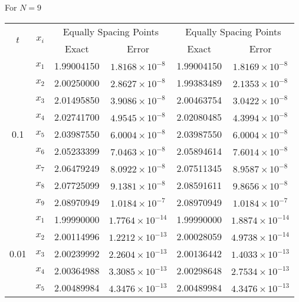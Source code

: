 	For \( N = 9 \)
	
	\begin{table}[ht]
		\renewcommand{\arraystretch}{1.5}
		\centering
		\begin{english}
\begin{tabular}{|c|c|c|c|c|c|}
			\hline
			\multirow{2}{*}{\( t \)} & \multirow{2}{*}{\( x_i \)} & \multicolumn{2}{c|}{Equally Spacing Points} & \multicolumn{2}{c|}{Equally Spacing Points} \\
			\cline{3-6}
			& & Exact & Error & Exact & Error \\
			\hline
			\multirow{9}{*}{0.1} & \( x_1 \) & 1.99004150 & \( 1.8168 \times 10^{-8} \) & 1.99004150 & \( 1.8169 \times 10^{-8} \) \\
			& \( x_2 \) & 2.00250000 & \( 2.8627 \times 10^{-8} \) & 1.99383489 & \( 2.1353 \times 10^{-8} \) \\
			& \( x_3 \) & 2.01495850 & \( 3.9086 \times 10^{-8} \) & 2.00463754 & \( 3.0422 \times 10^{-8} \) \\
			& \( x_4 \) & 2.02741700 & \( 4.9545 \times 10^{-8} \) & 2.02080485 & \( 4.3994 \times 10^{-8} \) \\
			& \( x_5 \) & 2.03987550 & \( 6.0004 \times 10^{-8} \) & 2.03987550 & \( 6.0004 \times 10^{-8} \) \\
			& \( x_6 \) & 2.05233399 & \( 7.0463 \times 10^{-8} \) & 2.05894614 & \( 7.6014 \times 10^{-8} \) \\
			& \( x_7 \) & 2.06479249 & \( 8.0922 \times 10^{-8} \) & 2.07511345 & \( 8.9587 \times 10^{-8} \) \\
			& \( x_8 \) & 2.07725099 & \( 9.1381 \times 10^{-8} \) & 2.08591611 & \( 9.8656 \times 10^{-8} \) \\
			& \( x_9 \) & 2.08970949 & \( 1.0184 \times 10^{-7} \) & 2.08970949 & \( 1.0184 \times 10^{-7} \) \\
			\hline
			\multirow{9}{*}{0.01} & \( x_1 \) & 1.99990000 & \( 1.7764 \times 10^{-14} \) & 1.99990000 & \( 1.8874 \times 10^{-14} \) \\
			& \( x_2 \) & 2.00114996 & \( 1.2212 \times 10^{-13} \) & 2.00028059 & \( 4.9738 \times 10^{-14} \) \\
			& \( x_3 \) & 2.00239992 & \( 2.2604 \times 10^{-13} \) & 2.00136442 & \( 1.4033 \times 10^{-13} \) \\
			& \( x_4 \) & 2.00364988 & \( 3.3085 \times 10^{-13} \) & 2.00298648 & \( 2.7534 \times 10^{-13} \) \\
			& \( x_5 \) & 2.00489984 & \( 4.3476 \times 10^{-13} \) & 2.00489984 & \( 4.3476 \times 10^{-13} \) \\

\end{tabular}
\end{english}
\end{table}
